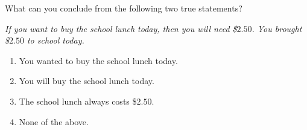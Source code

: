 What can you conclude from the following two true statements?

\emph{If you want to buy the school lunch today, then you will need \$$2.50$. You brought \$$2.50$ to school today.}
\begin{enumerate}
\item[(A)] You wanted to buy the school lunch today.
\item[(B)] You will buy the school lunch today.
\item[(C)] The school lunch always costs \$$2.50$.
\item[(D)] None of the above.
\end{enumerate}

